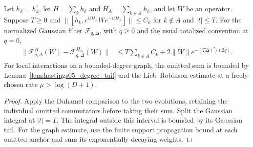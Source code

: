 \begin{lemma}
    \label{lem:hastings05_weighted_truncation}
    \leanok
    Let $h_k=h_k^\dagger$, let $H=\sum_k h_k$ and
    $H_A=\sum_{k\in A}h_k$, and let $W$ be an
    operator. Suppose $T\ge0$ and
    $\|[h_k,e^{itH_A}We^{-itH_A}]\|\le C_k$ for $k\notin A$ and
    $|t|\le T$. For the normalized Gaussian filter $\mathcal F_{q,\Delta}$,
    with $q\ge0$ and the usual totalized convention at $q=0$,
    \begin{align}
        \|\mathcal F_{q,\Delta}^{H}(W)
            -\mathcal F_{q,\Delta}^{H_A}(W)\|
        &\le T\sum_{k\notin A}C_k
            +2\|W\|e^{-(T\Delta)^2/(2q)}.
        \label{eq:hastings05_weighted_truncation}
    \end{align}
    For local interactions on a bounded-degree graph, the omitted sum is
    bounded by Lemma~\ref{lem:hastings05_degree_tail} and the
    Lieb--Robinson estimate at a freely chosen rate
    $\mu>\log(D+1)$.
\end{lemma}
\begin{proof}\leanok
    Apply the Duhamel comparison to the two evolutions, retaining the
    individual omitted commutators before taking their sum. Split the
    Gaussian integral at $|t|=T$. The integral outside this interval is
    bounded by its Gaussian tail. For the graph estimate, use the finite
    support propagation bound at each omitted anchor and sum its
    exponentially decaying weights.
\end{proof}

